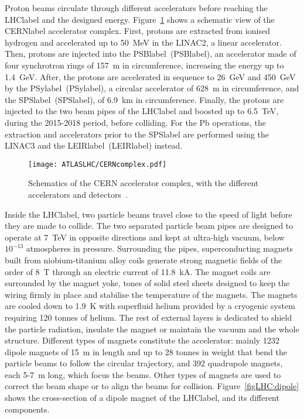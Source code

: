 Proton beams circulate through different accelerators before reaching the \acrshort{LHClabel} and the designed energy. Figure~\ref{figLHC:CERNcomplex} shows a schematic view of the \acrshort{CERNlabel} accelerator complex. First, protons are extracted from ionised hydrogen and accelerated up to 50~MeV in the LINAC2, a linear accelerator. Then, protons are injected into the \acrlong{PSBlabel}~(\acrshort{PSBlabel}), an accelerator made of four synchrotron rings of 157~m in circumference, increasing the energy up to 1.4~GeV. After, the protons are accelerated in sequence to 26~GeV and 450~GeV by the \acrlong{PSylabel}~(\acrshort{PSylabel}), a circular accelerator of 628~m in circumference, and the \acrlong{SPSlabel}~(\acrshort{SPSlabel}), of 6.9~km in circumference. Finally, the protons are injected to the two beam pipes of the \acrshort{LHClabel} and boosted up to 6.5~TeV, during the 2015-2018 period, before colliding. For the Pb operations, the extraction and accelerators prior to the \acrshort{SPSlabel} are performed using the LINAC3 and the \acrlong{LEIRlabel}~(\acrshort{LEIRlabel}) instead.

\begin{figure}[htbp]
    \RawFloats
    \begin{center}
    \texttt{[image: ATLASLHC/CERNcomplex.pdf]}
    \caption{
        Schematics of the CERN accelerator complex, with the different accelerators and detectors~\cite{CERNcomplex}. 
    }
    \label{figLHC:CERNcomplex}
    \end{center}
\end{figure}

Inside the \acrshort{LHClabel}, two particle beams travel close to the speed of light before they are made to collide. The two separated particle beam pipes are designed to operate at 7~TeV in opposite directions and kept at ultra-high vacuum, below $10^{-13}$ atmospheres in pressure. Surrounding the pipes, superconducting magnets built from niobium-titanium alloy coils generate strong magnetic fields of the order of 8~T through an electric current of 11.8~kA. The magnet coils are surrounded by the magnet yoke, tones of solid steel sheets designed to keep the wiring firmly in place and stabilise the temperature of the magnets. The magnets are cooled down to 1.9~K with superfluid helium provided by a cryogenic system requiring 120 tonnes of helium. The rest of external layers is dedicated to shield the particle radiation, insulate the magnet or maintain the vacuum and the whole structure. Different types of magnets constitute the accelerator: mainly 1232 dipole magnets of 15~m in length and up to 28 tonnes in weight that bend the particle beams to follow the circular trajectory, and 392 quadrupole magnets, each 5-7~m long, which focus the beams. Other types of magnets are used to correct the beam shape or to align the beams for collision. Figure~\ref{figLHC:dipole} shows the cross-section of a dipole magnet of the \acrshort{LHClabel}, and its different components.

